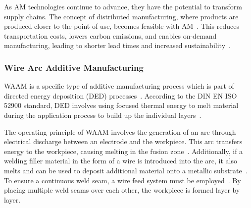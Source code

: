 
As \acrshort{AM} technologies continue to advance, they have the potential to transform supply chains. The concept of distributed manufacturing, where products are produced closer to the point of use, becomes feasible with AM~\cite{Jandyal.2022}. This reduces transportation costs, lowers carbon emissions, and enables on-demand manufacturing, leading to shorter lead times and increased sustainability~\cite{Haleem.2019}.



\subsubsection{Wire Arc Additive Manufacturing}
\acrshort{WAAM} is a specific type of additive manufacturing process which is part of directed energy deposition (\acrshort{DED}) processes~\cite{Svetlizky.2021}. According to the DIN EN ISO 52900 standard, DED involves using focused thermal energy to melt material during the application process to build up the individual layers~\cite{DIN66025}. 

The operating principle of \acrshort{WAAM} involves the generation of an arc through electrical discharge between an electrode and the workpiece. This arc transfers energy to the workpiece, causing melting in the fusion zone~\cite{Ou.2018}. Additionally, if a welding filler material in the form of a wire is introduced into the arc, it also melts and can be used to deposit additional material onto a metallic substrate~\cite{Cunningham.2018}. To ensure a continuous weld seam, a wire feed system must be employed~\cite{Ding.2015}. By placing multiple weld seams over each other, the workpiece is formed layer by layer.


